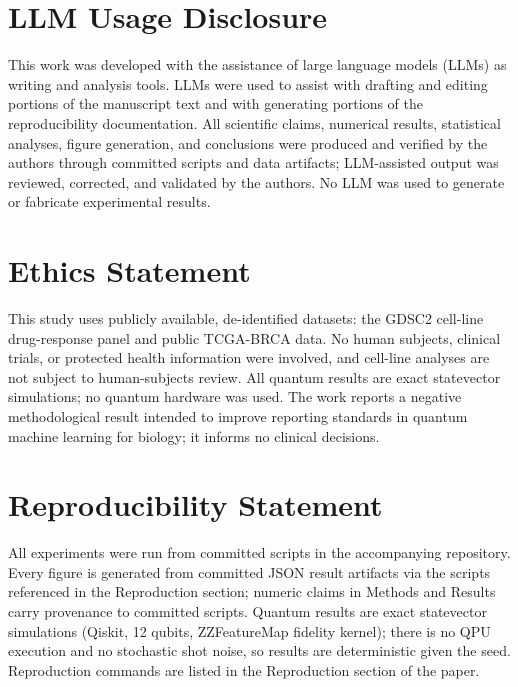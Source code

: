 
\section*{LLM Usage Disclosure}
This work was developed with the assistance of large language models (LLMs) as writing and
analysis tools. LLMs were used to assist with drafting and editing portions of the manuscript
text and with generating portions of the reproducibility documentation. All scientific claims,
numerical results, statistical analyses, figure generation, and conclusions were produced and
verified by the authors through committed scripts and data artifacts; LLM-assisted output was
reviewed, corrected, and validated by the authors. No LLM was used to generate or fabricate
experimental results.

\section*{Ethics Statement}
This study uses publicly available, de-identified datasets: the GDSC2 cell-line drug-response
panel and public TCGA-BRCA data. No human subjects, clinical trials, or protected health
information were involved, and cell-line analyses are not subject to human-subjects review. All
quantum results are exact statevector simulations; no quantum hardware was used. The work reports
a negative methodological result intended to improve reporting standards in quantum machine
learning for biology; it informs no clinical decisions.

\section*{Reproducibility Statement}
All experiments were run from committed scripts in the accompanying repository. Every figure is
generated from committed JSON result artifacts via the scripts referenced in the Reproduction
section; numeric claims in Methods and Results carry provenance to committed scripts. Quantum
results are exact statevector simulations (Qiskit, 12 qubits, ZZFeatureMap fidelity kernel);
there is no QPU execution and no stochastic shot noise, so results are deterministic given the
seed. Reproduction commands are listed in the Reproduction section of the paper.
